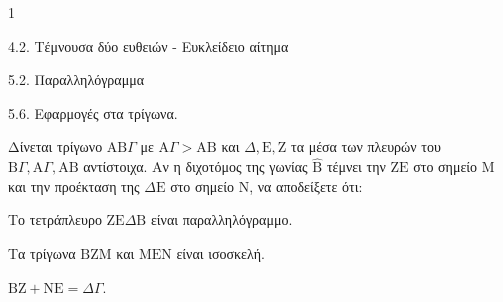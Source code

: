 \begin{ylh}{1}
    \item 4.2. Τέμνουσα δύο ευθειών - Ευκλείδειο αίτημα
    \item 5.2. Παραλληλόγραμμα
    \item 5.6. Εφαρμογές στα τρίγωνα.
\end{ylh}
Δίνεται τρίγωνο $\mathrm{A}\mathrm{B}\Gamma$ με $\mathrm{A}\Gamma > \mathrm{A}\mathrm{B}$ και $\Delta, \mathrm{E}, \mathrm{Z}$ τα μέσα των πλευρών του $\mathrm{B}\Gamma, \mathrm{A}\Gamma, \mathrm{A}\mathrm{B}$ αντίστοιχα. Αν η διχοτόμος της γωνίας $\hat{\mathrm{B}}$ τέμνει την $\mathrm{Z}\mathrm{E}$ στο σημείο $\mathrm{M}$ και την προέκταση της $\Delta\mathrm{E}$ στο σημείο $\mathrm{N}$, να αποδείξετε ότι:
\begin{alist}
    \item Το τετράπλευρο $\mathrm{Z}\mathrm{E}\Delta\mathrm{B}$ είναι παραλληλόγραμμο. 
    \item Τα τρίγωνα $\mathrm{B}\mathrm{Z}\mathrm{M}$ και $\mathrm{M}\mathrm{E}\mathrm{N}$ είναι ισοσκελή. 
    \item $\mathrm{B}\mathrm{Z} + \mathrm{N}\mathrm{E} = \Delta\Gamma$. 
\end{alist}
